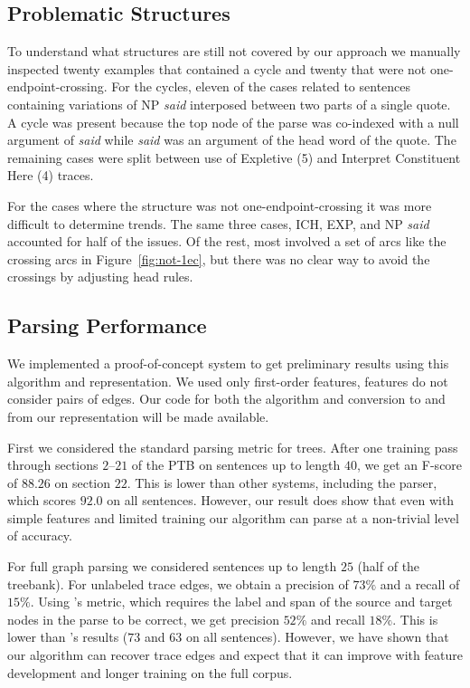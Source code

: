 \subsection{Problematic Structures}

To understand what structures are still not covered by our approach we manually inspected twenty examples that contained a cycle and twenty that were not one-endpoint-crossing.
For the cycles, eleven of the cases related to sentences containing variations of NP \emph{said} interposed between two parts of a single quote.
A cycle was present because the top node of the parse was co-indexed with a null argument of \emph{said} while \emph{said} was an argument of the head word of the quote.
The remaining cases were split between use of Expletive (5) and Interpret Constituent Here (4) traces.

For the cases where the structure was not one-endpoint-crossing it was more difficult to determine trends.
The same three cases, ICH, EXP, and NP \emph{said} accounted for half of the issues.
Of the rest, most involved a set of arcs like the crossing arcs in Figure~\ref{fig:not-1ec}, but there was no clear way to avoid the crossings by adjusting head rules.

\subsection{Parsing Performance}

We implemented a proof-of-concept system to get preliminary results using this algorithm and representation.
We used only first-order features, \myie features do not consider pairs of edges.
Our code for both the algorithm and conversion to and from our representation will be made available.

First we considered the standard parsing metric for trees.
After one training pass through sections $2$--$21$ of the PTB on sentences up to length $40$, we get an F-score of $88.26$ on section $22$.
This is lower than other systems, including the \textcite{cck} parser, which scores $92.0$ on all sentences.
However, our result does show that even with simple features and limited training our algorithm can parse at a non-trivial level of accuracy.

For full graph parsing we considered sentences up to length $25$ (half of the treebank).
For unlabeled trace edges, we obtain a precision of $73\%$ and a recall of $15\%$.
Using \textcite{Johnson:2002}'s metric, which requires the label and span of the source and target nodes in the parse to be correct, we get precision $52\%$ and recall $18\%$.
This is lower than \textcite{Johnson:2002}'s results ($73$ and $63$ on all sentences).
However, we have shown that our algorithm can recover trace edges and expect that it can improve with feature development and longer training on the full corpus.

